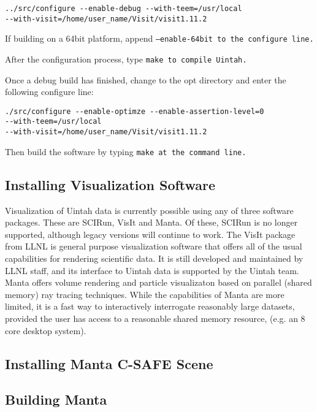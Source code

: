 \begin{Verbatim}[fontsize=\footnotesize]
../src/configure --enable-debug --with-teem=/usr/local
--with-visit=/home/user_name/Visit/visit1.11.2
\end{Verbatim}

If building on a 64bit platform, append \tt --enable-64bit \normalfont
to the configure line.

After the configuration process, type \tt make \normalfont to compile
Uintah.

Once a debug build has finished, change to the opt directory and enter
the following configure line:

\begin{Verbatim}[fontsize=\footnotesize]
./src/configure --enable-optimze --enable-assertion-level=0 
--with-teem=/usr/local
--with-visit=/home/user_name/Visit/visit1.11.2
\end{Verbatim}

Then build the software by typing \tt make \normalfont at the command line.

\subsection{Installing Visualization Software}

Visualization of Uintah data is currently possible using any of three
software packages.  These are SCIRun, VisIt and Manta.  Of these, SCIRun is
no longer supported, although legacy versions will continue to work.  The
VisIt package from LLNL is general purpose visualization software that offers
all of the usual capabilities for rendering scientific data.  It is still
developed and maintained by LLNL staff, and its interface to Uintah data is
supported by the Uintah team.  Manta offers volume rendering and particle
visualizaton based on parallel (shared memory) ray tracing techniques.
While the capabilities of Manta are more limited, it is a fast way to
interactively interrogate reasonably large datasets, provided the user has
access to a reasonable shared memory resource, (e.g. an 8 core desktop system).

\subsection{Installing Manta C-SAFE Scene}

\subsection{Building Manta}

